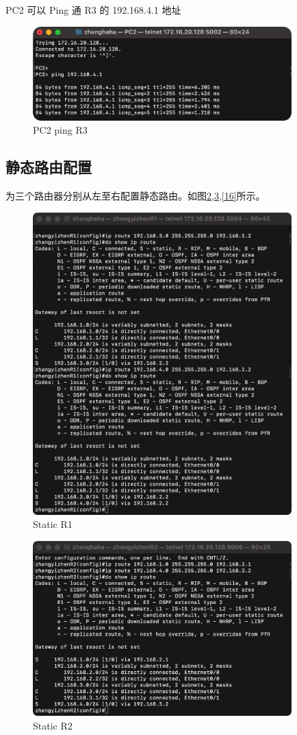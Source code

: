 \documentclass[a4paper,12pt]{report}
\begin{document}
\begin{spacing}{1.5}
PC2 可以 Ping 通 R3 的 192.168.4.1 地址
\begin{figure}[htb!]
  \centering
\includegraphics[width=10cm]{figure/PC2pingR3.png}
\caption{PC2 ping R3}
\label{13}
\end{figure}

\subsection{静态路由配置}
为三个路由器分别从左至右配置静态路由。如图\ref{14},\ref{15},\ref{16}所示。

\begin{figure}[htb!]
  \centering
\includegraphics[width=10cm]{figure/R1s.png}
\caption{Static R1}
\label{14}
\end{figure}

\begin{figure}[htb!]
  \centering
\includegraphics[width=10cm]{figure/R2s.png}
\caption{Static R2}
\label{15}
\end{figure}


\end{spacing}
\end{document}
